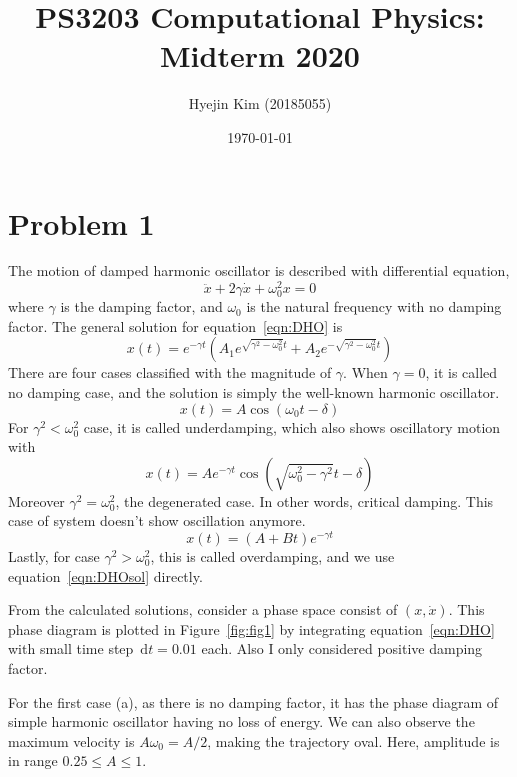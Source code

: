 \documentclass[reprint, nofootinbib]{revtex4-2} %
\newcommand{\ud}{\,\mathrm{d}}
\begin{document}
\title{PS3203 Computational Physics: Midterm 2020}
\author{Hyejin Kim (20185055)}
\date{\today}

\maketitle
\section{Problem 1}
The motion of damped harmonic oscillator is described with differential equation,
\begin{equation}\label{eqn:DHO}
	\ddot{x}+2\gamma\dot{x}+\omega_0^2x = 0
\end{equation}
where $\gamma$ is the damping factor, and $\omega_0$ is the natural frequency with no damping factor. The general solution for equation~\eqref{eqn:DHO} is~\cite{CMbook}
\begin{equation}\label{eqn:DHOsol}
	x(t) = e^{-\gamma t}\left(A_1e^{\sqrt{\gamma^2-\omega_0^2}t}
	+A_2e^{-\sqrt{\gamma^2-\omega_0^2}t}\right)
\end{equation}
There are four cases classified with the magnitude of $\gamma$. When $\gamma=0$, it is called no damping case, and the solution is simply the well-known harmonic oscillator.
\begin{equation}
	x(t) = A\cos(\omega_0t-\delta)
\end{equation}
For $\gamma^2<\omega_0^2$ case, it is called underdamping, which also shows oscillatory motion with
\begin{equation}
	x(t) = Ae^{-\gamma t}\cos\left(\sqrt{\omega_0^2-\gamma^2}t-\delta\right)
\end{equation}
Moreover $\gamma^2=\omega_0^2$, the degenerated case. In other words, critical damping. This case of system doesn't show oscillation anymore.
\begin{equation}
	x(t) = (A+Bt)e^{-\gamma t}
\end{equation}
Lastly, for case $\gamma^2>\omega_0^2$, this is called overdamping, and we use equation~\eqref{eqn:DHOsol} directly.

From the calculated solutions, consider a phase space consist of $(x, \dot{x})$. This phase diagram is plotted in Figure~\ref{fig:fig1} by integrating equation~\eqref{eqn:DHO} with small time step $\ud t=0.01$ each. Also I only considered positive damping factor.

For the first case (a), as there is no damping factor, it has the phase diagram of simple harmonic oscillator having no loss of energy. We can also observe the maximum velocity is $A\omega_0 = A/2$, making the trajectory oval. Here, amplitude is in range $0.25\leq A \leq 1$.
\end{document}

